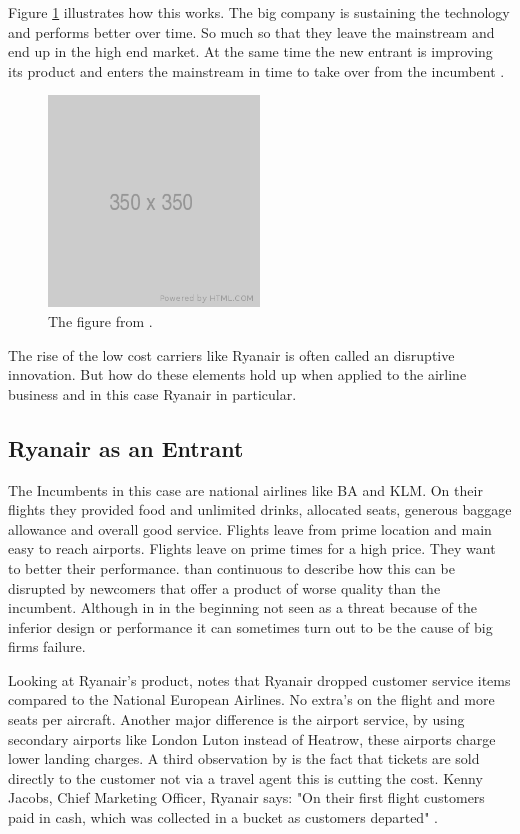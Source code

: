 \documentclass[a4paper, 11pt]{article}
\begin{document}
Figure \ref{fig:graph1} illustrates how this works. The big company is sustaining the technology and performs better over time. So much so that they leave the mainstream and end up in the high end market. At the same time the new entrant is improving its product and enters the mainstream in time to take over from the incumbent \cite{Christensen97}.

\begin{figure}[h!]
    \centering
    \includegraphics[width=0.5\textwidth]{350.png}
    \caption{The figure from \cite{Christensen97}.}
    \label{fig:graph1}
\end{figure}

The rise of the low cost carriers like Ryanair is often called an disruptive innovation.
But how do these elements hold up when applied to the airline business and in this case Ryanair in particular.


\subsection{Ryanair as an Entrant}


The Incumbents in this case are national airlines like BA and KLM. On their flights they provided food and unlimited drinks, allocated seats, generous baggage allowance and overall good service. Flights leave from prime location and main easy to reach airports. Flights leave on prime times for a high price. They want to better their performance. \cite{Christensen97} than continuous to describe how this can be disrupted by newcomers that offer a product of worse quality than the incumbent. Although in in the beginning not seen as a threat because of the inferior design or performance it can sometimes turn out to be the cause of big firms failure.

Looking at Ryanair's product, \cite{Barrett} notes that Ryanair dropped customer service items compared to the National European Airlines. No extra's on the flight and more seats per aircraft. Another major difference is the airport service, by using secondary airports like London Luton instead of Heatrow, these airports charge lower landing charges. A third observation by \cite{Barrett} is the fact that tickets are sold directly to the customer not via a travel agent this is cutting the cost. Kenny Jacobs, Chief Marketing Officer, Ryanair says: "On their first flight customers paid in cash, which was collected in a bucket as customers departed" \citep{ITBberlin}.
\end{document}
